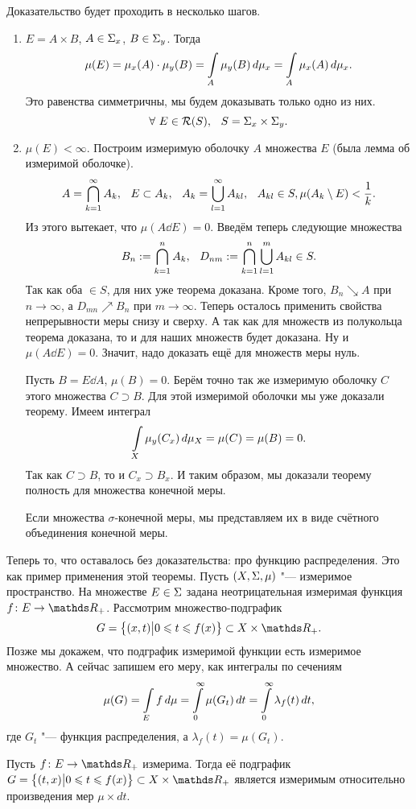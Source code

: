 \begin{Proof}
Доказательство будет проходить в несколько шагов.
\begin{enumerate}
  \item $E = A\times B$, $A\in\Sigma_x$, $B\in \Sigma_y$. Тогда
\[
  \mu(E) = \mu_x(A)\cdot \mu_y(B) = \int\limits_{A}\mu_y(B)\,d\mu_x = \int\limits_{A}\mu_x(A)\,d\mu_x.
\]
Это равенства симметричны, мы будем доказывать только одно из них.
\[
  \forall\ E\in\Rim(S),\pau S = \E_x\times \E_y.
\]
  \item $\mu(E)<\infty$. Построим измеримую оболочку $A$ множества $E$ (была лемма об измеримой оболочке).
\[
  A = \caP k1A_k,\pau E\subset A_k,\pau A_k = \uN l1A_{kl},\pau A_{kl}\in S, \mu(A_k\dd E)<\frac1k.
\]
Из этого вытекает, что $\mu(A\dd E)=0$. Введём теперь следующие множества
\[
  B_n := \CAP k1n A_k,\pau D_{nm}:=\CAP k1n\UN l1m A_{kl} \in S.
\]
 Так как оба $\in S$, для них уже теорема доказана. Кроме того, $B_n\searrow A$ при $n\to\infty$, а $D_{mn}\nearrow B_n$ при $m\to \infty$. Теперь осталось применить свойства непрерывности меры снизу и сверху. А так как для множеств из полукольца теорема доказана, то и для наших множеств будет доказана. Ну и $\mu(A\dd E) = 0$. Значит, надо доказать ещё для множеств меры нуль.

Пусть $B = E\dd A$, $\mu(B) = 0$. Берём точно так же измеримую оболочку $C$ этого множества $C\supset B$. Для этой измеримой оболочки мы уже доказали теорему. Имеем интеграл
\[
  \int\limits_{X}\mu_y(C_x)\,d\mu_X = \mu(C) = \mu(B) = 0.
\]
Так как $C\supset B$, то и $C_x\supset B_x$. И таким образом, мы доказали теорему полность для множества конечной меры.

Если множества $\sigma$-конечной меры, мы представляем их в виде счётного объединения конечной меры.
\end{enumerate}
\end{Proof}

Теперь то, что оставалось без доказательства: про функцию распределения. Это как пример применения этой теоремы. Пусть $(X,\Sigma,\mu)$ "--- измеримое пространство. На множестве $E\in\Sigma$ задана неотрицательная измеримая функция $f\colon E\to \R_+$. Рассмотрим множество-подграфик 
\[
  G = \big\{(x,t)\big|0\le t\le f(x)\big\}\subset X\times \R_+.
\]
Позже мы докажем, что подграфик измеримой функции есть измеримое множество. А сейчас запишем его меру, как интегралы по сечениям
\[
  \mu(G) = \int\limits_{E}f\,d\mu = \int\limits_0^\infty \mu(G_t)\,dt = \int\limits_0^\infty \lambda_f(t)\,dt,
\]
где $G_t$ "--- функция распределения, а $\lambda_f(t) = \mu(G_t)$.

\begin{Lem}
  Пусть $f\colon E\to\R_+$ измерима. Тогда её подграфик $G = \big\{(t,x)\big|0\le t\le f(x)\big\}\subset X\times\R_+$ является измеримым относительно произведения мер $\mu\times dt$.
\end{Lem}


